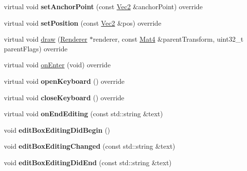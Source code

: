\begin{DoxyCompactItemize}
\item 
\mbox{\label{classui_1_1EditBoxImplCommon_a0ac6bf4e36e02e29fae142b5c72e987f}} 
virtual void {\bfseries set\+Anchor\+Point} (const \hyperlink{classVec2}{Vec2} \&anchor\+Point) override
\item 
\mbox{\label{classui_1_1EditBoxImplCommon_a5d432d7249a3f36d2f73b111a89b5898}} 
virtual void {\bfseries set\+Position} (const \hyperlink{classVec2}{Vec2} \&pos) override
\item 
virtual void \hyperlink{classui_1_1EditBoxImplCommon_a778a70b2785868a3b8e6953c95277573}{draw} (\hyperlink{classRenderer}{Renderer} $\ast$renderer, const \hyperlink{classMat4}{Mat4} \&parent\+Transform, uint32\+\_\+t parent\+Flags) override
\item 
virtual void \hyperlink{classui_1_1EditBoxImplCommon_a101c957f01d0323c0f9ed0d5f649a408}{on\+Enter} (void) override
\item 
\mbox{\label{classui_1_1EditBoxImplCommon_ac0fc0ac721cdbb28405bdb7fda392560}} 
virtual void {\bfseries open\+Keyboard} () override
\item 
\mbox{\label{classui_1_1EditBoxImplCommon_a99bbd606de03e790ba6888cfcb064ce7}} 
virtual void {\bfseries close\+Keyboard} () override
\item 
\mbox{\label{classui_1_1EditBoxImplCommon_a23a6c041d48fd32bc45975b174755a15}} 
virtual void {\bfseries on\+End\+Editing} (const std\+::string \&text)
\item 
\mbox{\label{classui_1_1EditBoxImplCommon_adbe1629e82e8aa3ff37151e0ef75de5d}} 
void {\bfseries edit\+Box\+Editing\+Did\+Begin} ()
\item 
\mbox{\label{classui_1_1EditBoxImplCommon_a7c70d9e42fa1a4550c34107c08e67ef1}} 
void {\bfseries edit\+Box\+Editing\+Changed} (const std\+::string \&text)
\item 
\mbox{\label{classui_1_1EditBoxImplCommon_a5db6b0a4ae335d3d7c3d71d8b7eb7ba3}} 
void {\bfseries edit\+Box\+Editing\+Did\+End} (const std\+::string \&text)

\end{DoxyCompactItemize}
